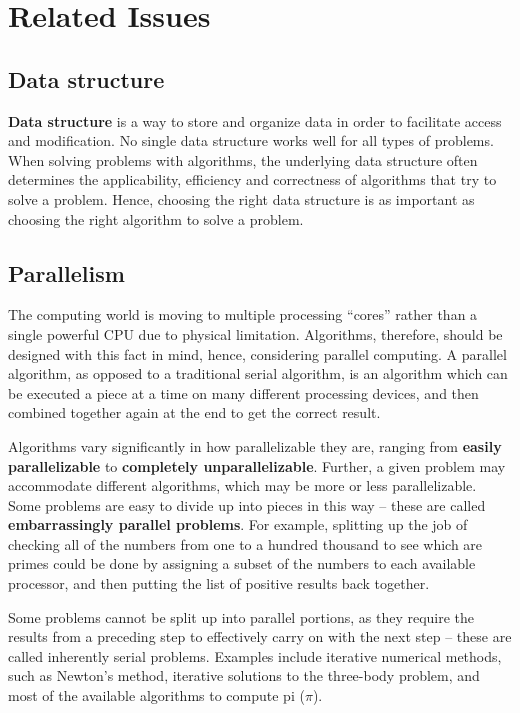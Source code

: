 \documentclass[12pt,a4paper]{book}
\begin{document}
\section{Related Issues}
\subsection{Data structure}
\textbf{Data structure} is a way to store and organize data in order to facilitate access and modification. No single data structure works well for all types of problems. When solving problems with algorithms, the underlying data structure often determines the applicability, efficiency and correctness of algorithms that try to solve a problem. Hence, choosing the right data structure is as important as choosing the right algorithm to solve a problem.
\subsection{Parallelism}
The computing world is moving to multiple processing “cores” rather than a single powerful CPU due to physical limitation. Algorithms, therefore, should be designed with this fact in mind, hence, considering parallel computing. A parallel algorithm, as opposed to a traditional serial algorithm, is an algorithm which can be executed a piece at a time on many different processing devices, and then combined together again at the end to get the correct result.
\par Algorithms vary significantly in how parallelizable they are, ranging from \textbf{easily parallelizable} to \textbf{completely unparallelizable}. Further, a given problem may accommodate different algorithms, which may be more or less parallelizable. Some problems are easy to divide up into pieces in this way – these are called \textbf{embarrassingly parallel problems}. For example, splitting up the job of checking all of the numbers from one to a hundred thousand to see which are primes could be done by assigning a subset of the numbers to each available processor, and then putting the list of positive results back together.
\par Some problems cannot be split up into parallel portions, as they require the results from a preceding step to effectively carry on with the next step – these are called inherently serial problems. Examples include iterative numerical methods, such as Newton's method, iterative solutions to the three-body problem, and most of the available algorithms to compute pi ($\pi$).
\end{document}
